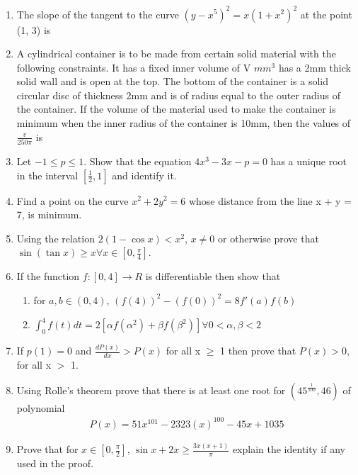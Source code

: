 \begin{enumerate}[label=\arabic*.,ref=\thesubsection.\theenumi]
\item The slope of the tangent to the curve $(y - x^5)^2 = x(1 + x^2)^2$ at the point (1, 3) is

\item A cylindrical container is to be made from certain solid material with the following constraints. It has a fixed inner volume of V $mm^3$ has a 2mm thick solid wall and is open at the top. The bottom of the container is a solid circular disc of thickness 2mm and is of radius equal to the outer radius of the container. If the volume of the material used to make the container is minimum when the inner radius of the container is 10mm, then the values of 
$\frac{v}{250\pi}$ is

\item Let $-1 \leq p \leq 1$. Show that the equation $4x^3 - 3x - p = 0$ has a unique root in the interval 
$[\frac{1}{2}, 1]$ and identify it.

\item Find a point on the curve $x^2 + 2y^2 = 6$ whose distance from the line x + y = 7, is minimum.

\item Using the relation $2(1 - \cos x) < x^2$, $x \neq  0$ or otherwise prove that $\sin(\tan x)\geq x \forall x \in [0, \frac{\pi}{4}]$.

\item If the function $f: [0, 4] \to R$ is differentiable then show that 
\begin{enumerate}
\item for $a, b \in(0, 4)$, $(f(4))^2 - (f(0))^2 = 8 f'(a)f(b)$
\item $\int_{0}^{4} f(t)dt = 2[\alpha f(\alpha^2) + \beta f(\beta^2)] \forall 0< \alpha, \beta < 2$
\end{enumerate}

\item If $p(1) = 0$ and $\frac{dP(x)}{dx} > P(x)$ for all x $\geq$ 1 then prove that $P(x) > 0$, for all x $>$ 1.

\item Using Rolle's theorem prove that there is at least one root for $(45^\frac{1}{100},46)$ of polynomial
\begin{align*}
P(x) = 51x^{101} - 2323(x)^{100} - 45x + 1035
\end{align*}

\item Prove that for $x \in [0, \frac{\pi}{2}]$, $\sin x + 2x \geq \frac{3x(x + 1)}{\pi}$ explain the identity if any used in the proof.


\end{enumerate}
